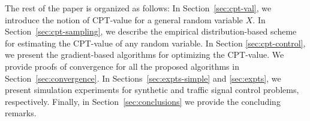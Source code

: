 The rest of the paper is organized as follows: 
In Section~\ref{sec:cpt-val}, we introduce the notion of CPT-value for a general random variable $X$.
In Section~\ref{sec:cpt-sampling}, we
describe the empirical distribution-based scheme for estimating the CPT-value of any random variable. In Section \ref{sec:cpt-control}, we present the gradient-based algorithms for optimizing the CPT-value. 
We provide proofs of convergence for all the proposed algorithms in Section~\ref{sec:convergence}.
In Sections~\ref{sec:expts-simple} and \ref{sec:expts}, we present simulation experiments for synthetic and traffic signal control problems, respectively. Finally, in Section~\ref{sec:conclusions} we provide the concluding remarks.

